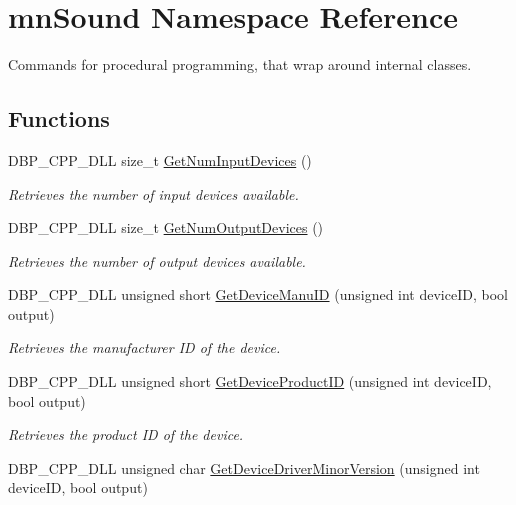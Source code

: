 \hypertarget{namespacemn_sound}{
\section{mnSound Namespace Reference}
\label{namespacemn_sound}
}


Commands for procedural programming, that wrap around internal classes.  


\subsection*{Functions}
\begin{DoxyCompactItemize}
\item 
DBP\_\-CPP\_\-DLL size\_\-t \hyperlink{namespacemn_sound_ab5dbce73cd96c949c772e267048aaebc}{GetNumInputDevices} ()
\begin{DoxyCompactList}\small\item\em Retrieves the number of input devices available. \item\end{DoxyCompactList}\item 
DBP\_\-CPP\_\-DLL size\_\-t \hyperlink{namespacemn_sound_a20d9da8488c3004ebaed3a0b6ea1b43b}{GetNumOutputDevices} ()
\begin{DoxyCompactList}\small\item\em Retrieves the number of output devices available. \item\end{DoxyCompactList}\item 
DBP\_\-CPP\_\-DLL unsigned short \hyperlink{namespacemn_sound_a64f1bbb2a178dfc7830b9d053c16fe94}{GetDeviceManuID} (unsigned int deviceID, bool output)
\begin{DoxyCompactList}\small\item\em Retrieves the manufacturer ID of the device. \item\end{DoxyCompactList}\item 
DBP\_\-CPP\_\-DLL unsigned short \hyperlink{namespacemn_sound_afad4600d4c3416dde18e305fff85a764}{GetDeviceProductID} (unsigned int deviceID, bool output)
\begin{DoxyCompactList}\small\item\em Retrieves the product ID of the device. \item\end{DoxyCompactList}\item 
DBP\_\-CPP\_\-DLL unsigned char \hyperlink{namespacemn_sound_a5edb517f5ed56a38290a5a0f75166e61}{GetDeviceDriverMinorVersion} (unsigned int deviceID, bool output)

\end{DoxyCompactItemize}

